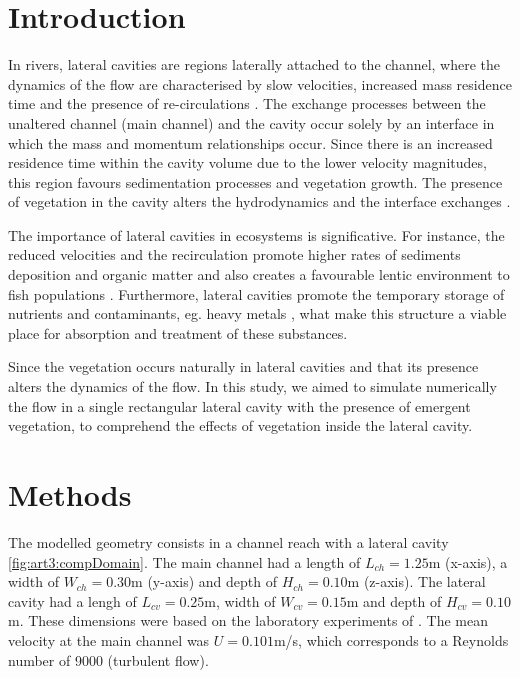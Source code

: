 \section{Introduction}
In rivers, lateral cavities are regions laterally attached to the channel, where the dynamics of the flow are characterised by slow velocities, increased mass residence time and the presence of re-circulations \cite{chang_constantinescu_park_2006}. The exchange processes between the unaltered channel (main channel) and the cavity occur solely by an interface in which the mass and momentum relationships occur. Since there is an increased residence time within the cavity volume due to the lower velocity magnitudes, this region favours sedimentation processes and vegetation growth. The presence of vegetation in the cavity alters the hydrodynamics and the interface exchanges \cite{xiang2019}.

The importance of lateral cavities in ecosystems is significative. For instance, the reduced velocities and the recirculation promote higher rates of sediments deposition and organic matter \cite{Juez2018} and also creates a favourable lentic environment to fish populations \cite{Landwust2006}. Furthermore, lateral cavities promote the temporary storage of nutrients and contaminants, eg. heavy metals \cite{Argerich2011,xiang2019}, what make this structure a viable place for absorption and treatment of these substances.

Since the vegetation occurs naturally in lateral cavities and that its presence alters the dynamics of the flow. In this study, we aimed to simulate numerically the flow in a single rectangular lateral cavity with the presence of emergent vegetation, to comprehend the effects of vegetation inside the lateral cavity.

\section{Methods}
The modelled geometry consists in a channel reach with a lateral cavity \ref{fig:art3:compDomain}. The main channel had a length of $L_{ch}=1.25$m (x-axis), a width of $W_{ch}=0.30$m (y-axis) and depth of $H_{ch}=0.10$m (z-axis). The lateral cavity had a lengh of $L_{cv}=0.25$m, width of $W_{cv}=0.15$m and depth of $H_{cv}=0.10$m. These dimensions were based on the laboratory experiments of \textcite{xiang2019}. The mean velocity at the main channel was $U=0.101$m/s, which corresponds to a Reynolds number of 9000 (turbulent flow).

